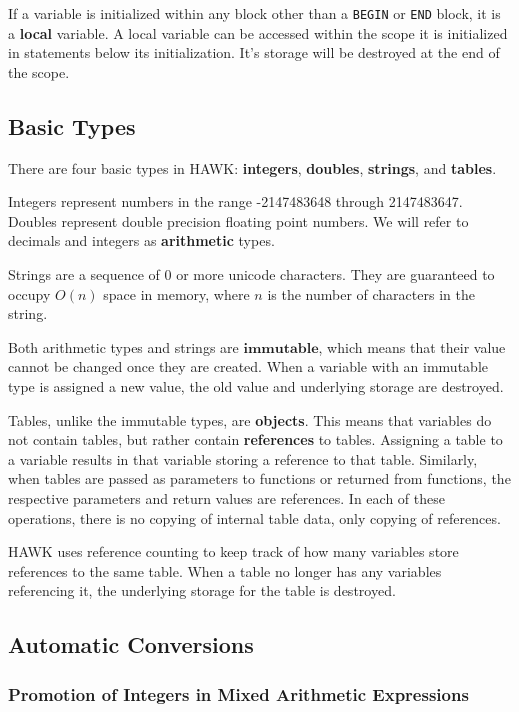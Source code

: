 \documentclass[12pt]{article}
\begin{document}
If a variable is initialized within any block other than a \texttt{BEGIN} or \texttt{END} block, it is a \textbf{local} variable. A local variable can be accessed within the scope it is initialized in statements below its initialization. It's storage will be destroyed at the end of the scope.

\subsection*{Basic Types}

There are four basic types in HAWK: \textbf{integers}, \textbf{doubles}, \textbf{strings}, and \textbf{tables}. 

Integers represent numbers in the range -2147483648 through 2147483647. Doubles represent double precision floating point numbers. We will refer to decimals and integers as \textbf{arithmetic} types.

Strings are a sequence of 0 or more unicode characters. They are guaranteed to occupy $O(n)$ space in memory, where $n$ is the number of characters in the string.

Both arithmetic types and strings are $\textbf{immutable}$, which means that their value cannot be changed once they are created. When a variable with an immutable type is assigned a new value, the old value and underlying storage are destroyed. 

Tables, unlike the immutable types, are \textbf{objects}. This means that variables do not contain tables, but rather contain \textbf{references} to tables. Assigning a table to a variable results in that variable storing a reference to that table. Similarly, when tables are passed as parameters to functions or returned from functions, the respective parameters and return values are references. In each of these operations, there is no copying of internal table data, only copying of references. 

HAWK uses reference counting to keep track of how many variables store references to the same table. When a table no longer has any variables referencing it, the underlying storage for the table is destroyed.  

\subsection*{Automatic Conversions}

\subsubsection*{Promotion of Integers in Mixed Arithmetic Expressions}
\end{document}
